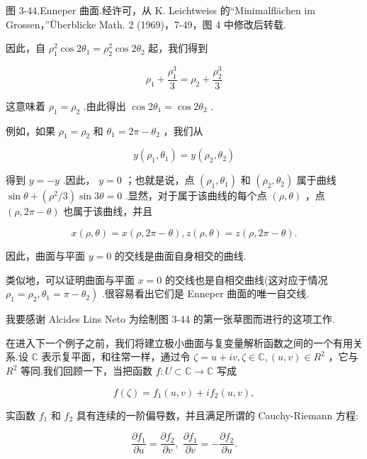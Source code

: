 图 3-44.Enneper 曲面.经许可，从 K. Leichtweiss 的“Minimalflächen im Grossen，”Überblicke Math. 2 (1969)，7-49，图 4 中修改后转载.

因此，自 \({\rho }_{1}^{2}\cos 2{\theta }_{1} = {\rho }_{2}^{2}\cos 2{\theta }_{2}\) 起，我们得到

\[
{\rho }_{1} + \frac{{\rho }_{1}^{3}}{3} = {\rho }_{2} + \frac{{\rho }_{2}^{3}}{3}
\]

这意味着 \({\rho }_{1} = {\rho }_{2}\) .由此得出 \(\cos 2{\theta }_{1} = \cos 2{\theta }_{2}\) .

例如，如果 \({\rho }_{1} = {\rho }_{2}\) 和 \({\theta }_{1} = {2\pi } - {\theta }_{2}\) ，我们从

\[
y\left( {{\rho }_{1},{\theta }_{1}}\right)  = y\left( {{\rho }_{2},{\theta }_{2}}\right)
\]

得到 \(y =  - y\) .因此， \(y = 0\) ；也就是说，点 \(\left( {{\rho }_{1},{\theta }_{1}}\right)\) 和 \(\left( {{\rho }_{2},{\theta }_{2}}\right)\) 属于曲线 \(\sin \theta  + \left( {{\rho }^{2}/3}\right) \sin {3\theta } = 0\) .显然，对于属于该曲线的每个点 \(\left( {\rho ,\theta }\right)\) ，点 \(\left( {\rho ,{2\pi } - \theta }\right)\) 也属于该曲线，并且

\[
x\left( {\rho ,\theta }\right)  = x\left( {\rho ,{2\pi } - \theta }\right) ,z\left( {\rho ,\theta }\right)  = z\left( {\rho ,{2\pi } - \theta }\right) .
\]

因此，曲面与平面 \(y = 0\) 的交线是曲面自身相交的曲线.

类似地，可以证明曲面与平面 \(x = 0\) 的交线也是自相交曲线(这对应于情况 \(\left. {{\rho }_{1} = {\rho }_{2},{\theta }_{1} = \pi  - {\theta }_{2}}\right)\) .很容易看出它们是 Enneper 曲面的唯一自交线.

我要感谢 Alcides Lins Neto 为绘制图 3-44 的第一张草图而进行的这项工作.

在进入下一个例子之前，我们将建立极小曲面与复变量解析函数之间的一个有用关系.设 \(\mathbb{C}\) 表示复平面，和往常一样，通过令 \(\zeta  = u + {iv},\zeta  \in  \mathbb{C},\left( {u,v}\right)  \in  {R}^{2}\) ，它与 \({R}^{2}\) 等同.我们回顾一下，当把函数 \(f : U \subset  \mathbb{C} \rightarrow  \mathbb{C}\) 写成

\[
f\left( \zeta \right)  = {f}_{1}\left( {u,v}\right)  + i{f}_{2}\left( {u,v}\right) ,
\]

实函数 \({f}_{1}\) 和 \({f}_{2}\) 具有连续的一阶偏导数，并且满足所谓的 Cauchy-Riemann 方程:

\[
\frac{\partial {f}_{1}}{\partial u} = \frac{\partial {f}_{2}}{\partial v},\;\frac{\partial {f}_{1}}{\partial v} =  - \frac{\partial {f}_{2}}{\partial u}.
\]

